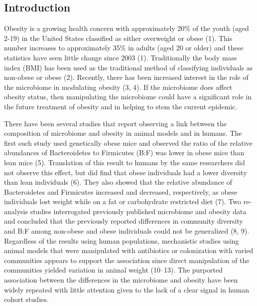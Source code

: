 \documentclass[12pt,]{article}
\begin{document}
\newpage

\subsection{Introduction}\label{introduction}

Obesity is a growing health concern with approximately 20\% of the youth
(aged 2-19) in the United States classified as either overweight or
obese (1). This number increases to approximately 35\% in adults (aged
20 or older) and these statistics have seen little change since 2003
(1). Traditionally the body mass index (BMI) has been used as the
traditional method of classifying individuals as non-obese or obese (2).
Recently, there has been increased interest in the role of the
microbiome in modulating obesity (3, 4). If the microbiome does affect
obesity status, then manipulating the microbiome could have a
significant role in the future treatment of obesity and in helping to
stem the current epidemic.

There have been several studies that report observing a link between the
composition of microbiome and obesity in animal models and in humans.
The first such study used genetically obese mice and observed the ratio
of the relative abundances of Bacteroidetes to Firmicutes (B:F) was
lower in obese mice than lean mice (5). Translation of this result to
humans by the same researchers did not observe this effect, but did find
that obese individuals had a lower diversity than lean individuals (6).
They also showed that the relative abundance of Bacteroidetes and
Firmicutes increased and decreased, respectively, as obese individuals
lost weight while on a fat or carbohydrate restricted diet (7). Two
re-analysis studies interrogated previously published microbiome and
obesity data and concluded that the previously reported differences in
community diversity and B:F among non-obese and obese individuals could
not be generalized (8, 9). Regardless of the results using human
populations, mechanistic studies using animal models that were
manipulated with antibiotics or colonization with varied communities
appears to support the association since direct manipulation of the
communities yielded variation in animal weight (10--13). The purported
association between the differences in the microbiome and obesity have
been widely repeated with little attention given to the lack of a clear
signal in human cohort studies.
\end{document}
